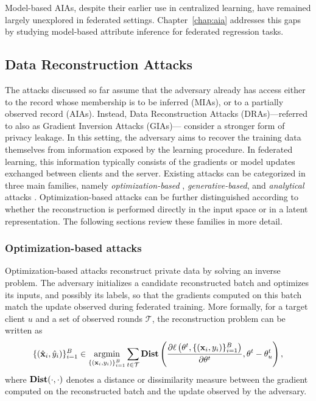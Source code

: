 Model-based AIAs, despite their earlier use in centralized learning, have remained largely unexplored in federated settings. Chapter~\ref{chap:aia} addresses this gaps by studying model-based attribute inference for federated regression tasks.



\subsection{Data Reconstruction Attacks}\label{sec:dra}

The attacks discussed so far assume that the adversary already has access either to the record whose membership is to be inferred (MIAs), or to a partially observed record (AIAs). Instead, Data Reconstruction Attacks (DRAs)---referred to also as Gradient Inversion Attacks (GIAs)--- consider a stronger form of privacy leakage. In this setting, the adversary aims to recover the training data themselves from information exposed by the learning procedure. In federated learning, this information typically consists of the gradients or model updates exchanged between clients and the server. Existing attacks can be categorized in three main families, namely \textit{optimization-based} , \textit{generative-based}, and \textit{analytical} attacks \cite{carletti2025sok, Du_gia_survey}. Optimization-based attacks can be further distinguished according to whether the reconstruction is performed directly in the input space or in a latent representation. The following sections review these families in more detail.

\subsubsection{Optimization-based attacks}\label{subsec:optim_gradient_inversion}
Optimization-based attacks reconstruct private data by solving an inverse problem. The adversary initializes a candidate reconstructed batch and optimizes its inputs, and possibly its labels, so that the gradients computed on this batch match the update observed during federated training. More formally, for a target client $u$ and a set of observed rounds $\mathcal{T}$, the reconstruction problem can be written as
    \begin{equation}\label{eq:gia_general}
        \{(\hat{{\mathbf{x}}}_i,\hat{y}_i)\}_{i=1}^{B}
        \in
        \operatorname*{argmin}_{\{({\mathbf{x}}_i,y_i)\}_{i=1}^{B}}
        \sum_{t\in\mathcal{T}}
        \operatorname{\textbf {Dist}}\left(
            \frac{\partial \ell\left(
                \theta^t,
                \{({\mathbf{x}}_i,y_i)\}_{i=1}^{B}
            \right)}{\partial \theta^t},
            \theta^t-\theta_u^t
        \right),
    \end{equation}
    where $\operatorname{\textbf {Dist}}(\cdot,\cdot)$ denotes a distance or dissimilarity measure between the gradient computed on the reconstructed batch and the update observed by the adversary. 

